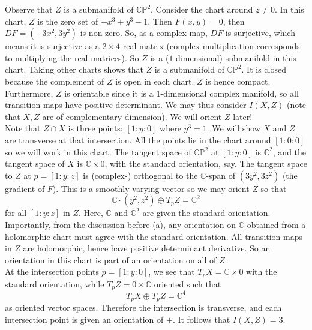 \documentclass{amsbook}
\theoremstyle{theorem}
\theoremstyle{plain}
\theoremstyle{remark}
\newcommand{\C}{\mathbb C}
\renewcommand{\P}{\mathbb P}
\begin{document}
Observe that $Z$ is a submanifold of $\C\P^2$. Consider the chart around $z \neq 0$. In this chart, $Z$ is the zero set of $-x^3+y^3-1$. Then $F(x,y) = 0$, then $DF = (-3x^2, 3y^2)$ is non-zero. So, as a complex map, $DF$ is surjective, which means it is surjective as a $2\times 4$ real matrix (complex multiplication corresponds to multiplying the real matrices). So $Z$ is a ($1$-dimensional) submanifold in this chart. Taking other charts shows that $Z$ is a submanifold of $\C\P^2$. It is closed because the complement of $Z$ is open in each chart. $Z$ is hence compact. Furthermore, $Z$ is orientable since it is a $1$-dimensional complex manifold, so all transition maps have positive determinant. We may thus consider $I(X,Z)$ (note that $X,Z$ are of complementary dimension). We will orient $Z$ later!\\

Note that $Z\cap X$ is three points: $[1:y:0]$ where $y^3 = 1$. We will show $X$ and $Z$ are transverse at that intersection. All the points lie in the chart around $[1:0:0]$ so we will work in this chart. The tangent space of $\C\P^2$ at $[1:y:0]$ is $\C^2$, and the tangent space of $X$ is $\C \times 0$, with the standard orientation, say. The tangent space to $Z$ at $p = [1:y:z]$ is (complex-) orthogonal to the $\C$-span of $(3y^2, 3z^2)$ (the gradient of $F$). This is a smoothly-varying vector so we may orient $Z$ so that \[\C\cdot (y^2, z^2) \oplus T_pZ = \C^2\] for all $[1:y:z]$ in $Z$. Here, $\C$ and $\C^2$ are given the standard orientation. Importantly, from the discussion before (a), any orientation on $\C$ obtained from a holomorphic chart must agree with the standard orientation. All transition maps in $Z$ are holomorphic, hence have positive determinant derivative. So an orientation in this chart is part of an orientation on all of $Z$.\\

At the intersection points $p=[1:y:0]$, we see that $T_pX = \C \times 0$ with the standard orientation, while $T_pZ = 0\times \C$ oriented such that \[T_pX\oplus T_pZ = \C^4\] as oriented vector spaces. Therefore the intersection is transverse, and each intersection point is given an orientation of $+$. It follows that $I(X,Z) = 3$.



% 
% 

\end{document}
